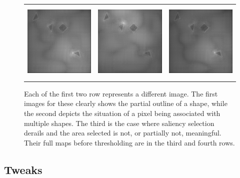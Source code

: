 \begin{figure}[t]
\begin{center}
\begin{tabular}{c c c}
            \includegraphics[width=1.5in, height=1.5in]{Counting/LaTeX/figures/putasideall/limitscaleresamplingoptionnetworkputaside/image2/touse/1-saliency.png} & \includegraphics[width=1.5in, height=1.5in]{Counting/LaTeX/figures/putasideall/limitscaleresamplingoptionnetworkputaside/image2/touse/2-saliency.png} & \includegraphics[width=1.5in, height=1.5in]{Counting/LaTeX/figures/putasideall/limitscaleresamplingoptionnetworkputaside/image2/touse/3-saliency.png}
        \end{tabular}
    \end{center}
    \caption{Each of the first two row represents a different image. The first images for these
             clearly shows the partial outline of a shape, while the second depicts the situation of
             a pixel being associated with multiple shapes. The third is the case where saliency
             selection derails and the area selected is not, or partially not, meaningful. Their
             full maps before thresholding are in the third and fourth rows.}
    \label{shapecorrelation}
\end{figure}



\subsection{Tweaks}



